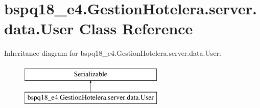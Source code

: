\hypertarget{classbspq18__e4_1_1_gestion_hotelera_1_1server_1_1data_1_1_user}{}\section{bspq18\+\_\+e4.\+Gestion\+Hotelera.\+server.\+data.\+User Class Reference}
\label{classbspq18__e4_1_1_gestion_hotelera_1_1server_1_1data_1_1_user}
Inheritance diagram for bspq18\+\_\+e4.\+Gestion\+Hotelera.\+server.\+data.\+User\+:\begin{figure}[H]
\begin{center}
\leavevmode
\includegraphics[height=2.000000cm]{classbspq18__e4_1_1_gestion_hotelera_1_1server_1_1data_1_1_user}
\end{center}
\end{figure}
